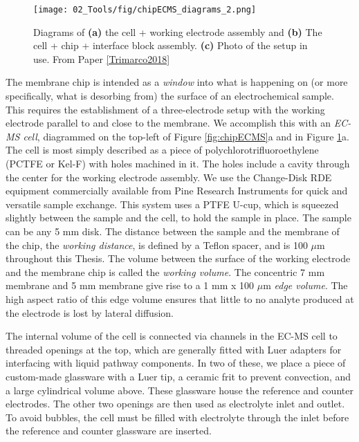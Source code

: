 \begin{figure}[h!]
	\centering
	\texttt{[image: 02\_Tools/fig/chipECMS\_diagrams\_2.png]}
	\caption{Diagrams of \textbf{(a)} the cell + working electrode assembly and \textbf{(b)} The cell + chip + interface block assembly. \textbf{(c)} Photo of the setup in use. From Paper \ref{Trimarco2018}}
	\label{fig:chipECMS2}
\end{figure}

The membrane chip is intended as a \textit{window} into what is happening on (or more specifically, what is desorbing from) the surface of an electrochemical sample. This requires the establishment of a three-electrode setup with the working electrode parallel to and close to the membrane. We accomplish this with an \textit{EC-MS cell}, diagrammed on the top-left of Figure \ref{fig:chipECMS}a and in Figure \ref{fig:chipECMS2}a. The cell is most simply described as a piece of polychlorotrifluoroethylene (PCTFE or Kel-F) with holes machined in it. The holes include a cavity through the center for the working electrode assembly. We use the Change-Disk RDE equipment commercially available from Pine Research Instruments for quick and versatile sample exchange. This system uses a PTFE U-cup, which is squeezed slightly between the sample and the cell, to hold the sample in place. The sample can be any 5 mm disk. The distance between the sample and the membrane of the chip, the \textit{working distance}, is defined by a Teflon spacer, and is 100 $\mu$m throughout this Thesis. The volume between the surface of the working electrode and the membrane chip is called the \textit{working volume}. The concentric 7 mm membrane and 5 mm membrane give rise to a 1 mm x 100 $\mu$m \textit{edge volume}. The high aspect ratio of this edge volume ensures that little to no analyte produced at the electrode is lost by lateral diffusion. 

The internal volume of the cell is connected via channels in the EC-MS cell to threaded openings at the top, which are generally fitted with Luer adapters for interfacing with liquid pathway components. In two of these, we place a piece of custom-made glassware with a Luer tip, a ceramic frit to prevent convection, and a large cylindrical volume above. These glassware house the reference and counter electrodes. The other two openings are then used as electrolyte inlet and outlet. To avoid bubbles, the cell must be filled with electrolyte through the inlet before the reference and counter glassware are inserted.

